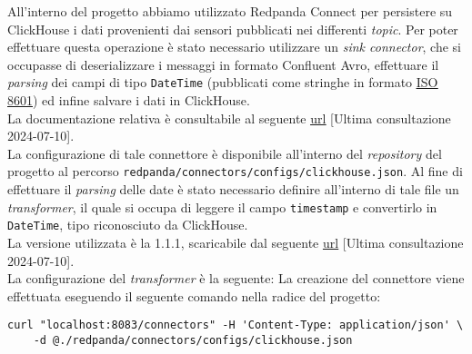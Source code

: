 All'interno del progetto abbiamo utilizzato Redpanda Connect per persistere su ClickHouse i dati provenienti dai sensori pubblicati nei differenti \textit{topic}. Per
poter effettuare questa operazione è stato necessario utilizzare un \textit{sink connector}, che si occupasse di deserializzare i messaggi in formato Confluent Avro, effettuare
il \textit{parsing} dei campi di tipo \texttt{DateTime} (pubblicati come stringhe in formato \href{https://www.iso.org/iso-8601-date-and-time-format.html}{\underline{ISO 8601}})
ed infine salvare i dati in ClickHouse.\\
La documentazione relativa è consultabile al seguente \href{https://clickhouse.com/docs/en/integrations/kafka/clickhouse-kafka-connect-sink}{\underline{url}}
[Ultima consultazione 2024-07-10].\\
La configurazione di tale connettore è disponibile all'interno del \textit{repository} del progetto al percorso \texttt{redpanda/connectors/configs/clickhouse.json}.
Al fine di effettuare il \textit{parsing} delle date è stato necessario definire all'interno di tale file un \textit{transformer}, il quale si occupa di leggere il campo \texttt{timestamp}
e convertirlo in \texttt{DateTime}, tipo riconosciuto da ClickHouse.\\
La versione utilizzata è la 1.1.1, scaricabile dal seguente \href{https://github.com/ClickHouse/clickhouse-kafka-connect/releases}{\underline{url}} [Ultima consultazione 2024-07-10].\\
La configurazione del \textit{transformer} è la seguente:
La creazione del connettore viene effettuata eseguendo il seguente comando nella radice del progetto:
\begin{verbatim}
curl "localhost:8083/connectors" -H 'Content-Type: application/json' \
    -d @./redpanda/connectors/configs/clickhouse.json
\end{verbatim}

